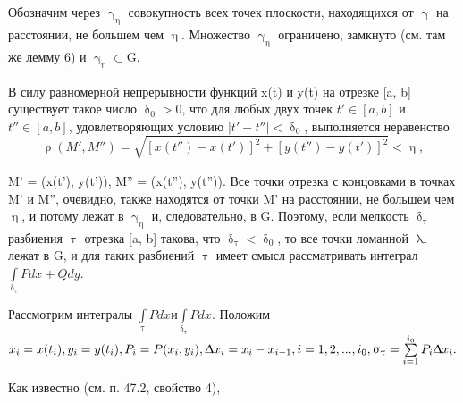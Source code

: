 \documentclass[a5paper, 11pt]{article}
\begin{document}
{ 

\\ \\
Обозначим через $\upgamma_\upeta$ совокупность всех точек плоскости, находящихся от $\upgamma$ на расстоянии, не большем чем $\upeta$. Множество $\upgamma_\upeta$ ограничено, замкнуто (см. там же лемму 6) и $\upgamma_\upeta{\subset}$G.
\par В силу равномерной непрерывности функций x(t) и y(t) на отрезке
[a, b] существует такое число $\updelta_0 > 0$, что для любых двух точек $t' \in[a,b]$ и $t''\in[a, b]$, удовлетворяющих условию $|t' - t''| < \updelta_0$, выполняется неравенство 
$$\uprho(M', M'')=\sqrt{[x(t'')-x(t')]^2+[y(t'')-y(t')]^2}<\upeta, $$

 M' = (x(t'), y(t')), M'' = (x(t''), y(t'')). Все точки отрезка с концовками в точках M' и M'', очевидно, также находятся от точки M' на расстоянии, не большем чем $\upeta$, и потому лежат в $\upgamma_\upeta$ и, следовательно, в G. Поэтому, если мелкость $\updelta_\uptau$ разбиения $\uptau$ отрезка [a, b] такова, что $\updelta_\uptau < \updelta_0$, то все точки ломанной $\uplambda_\uptau$ лежат в G, и для таких разбиений $\uptau$ имеет смысл рассматривать интеграл $\int\limits_{\updelta_\uptau}{Pdx}+ Qdy$.
\par Рассмотрим интегралы $\int\limits_\uptau{P} dx и \int\limits_{\updelta_\uptau}P dx.$ Положим \\
$x_i=x(t_i), y_i=y(t_i), P_i=P(x_i, y_i), \Updelta{x_i=x_i-x_{i-1}}, i=1, 2,  ..., i_0, \upsigma_\uptau=\sum\limits_{i=1}^{i_0}P_i\Updelta{x_i}.$
\par Как известно (см. п. 47.2, свойство 4),
}
\end{document}
